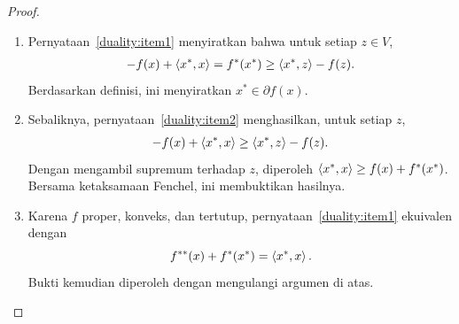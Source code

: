 \begin{proof}
    \leavevmode\par\smallskip
    \begin{enumerate}
        \item[\ref{duality:item1}$\rightarrow$\ref{duality:item2}:] Pernyataan~\ref{duality:item1} menyiratkan bahwa untuk setiap $z\in V$,
        \begin{equation}
            \begin{aligned}
                -f(x) + \left\langle x^* , x\right\rangle = f^*(x^*) \geq \left\langle x^* , z\right\rangle - f(z).
            \end{aligned}
        \end{equation}
        Berdasarkan definisi, ini menyiratkan $x^*\in \partial f(x)$.
        \item[\ref{duality:item2}$\rightarrow$\ref{duality:item1}:]
        Sebaliknya, pernyataan~\ref{duality:item2} menghasilkan, untuk setiap $z$,
        \begin{equation}
            \begin{aligned}
                -f(x) + \left\langle x^* , x\right\rangle \geq \left\langle x^* , z\right\rangle - f(z).
            \end{aligned}
        \end{equation}
        Dengan mengambil supremum terhadap $z$, diperoleh $\left\langle x^* , x\right\rangle \geq f(x) + f^*(x^*)$. Bersama ketaksamaan Fenchel, ini membuktikan hasilnya.
        \item[\ref{duality:item1}$\leftrightarrow$\ref{duality:item3}:]
        Karena $f$ proper, konveks, dan tertutup, pernyataan~\ref{duality:item1} ekuivalen dengan
        \begin{equation}
            f^{**}(x) + f^*(x^*) = \left\langle x^* , x\right\rangle.
        \end{equation}
        Bukti kemudian diperoleh dengan mengulangi argumen di atas.
    \end{enumerate}
\end{proof}

